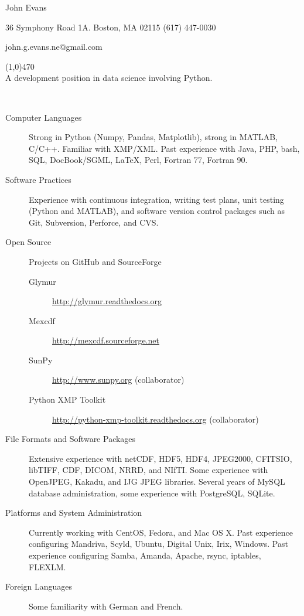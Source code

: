 \documentclass[11pt]{article}  %
\begin{document}
 
\centerline{{\Huge \sc John Evans}  }   %
\centerline{36 Symphony Road 1A. \textbullet \hspace{5pt}  Boston, MA  02115 \textbullet \hspace{5pt}  (617) 447-0030} 
\centerline{john.g.evans.ne@gmail.com} 
\noindent
\line(1,0){470}  \\

\smallskip %
\noindent
A development position in data science involving Python.\medskip

\bigskip %
\\ 
\begin{description}
  \item[Computer Languages]Strong in Python (Numpy, Pandas, Matplotlib), strong
    in MATLAB, C/C++.  Familiar with XMP/XML.  Past experience with Java, PHP,
    bash, SQL, DocBook/SGML, \LaTeX, Perl, Fortran 77, Fortran 90.
  \item[Software Practices]Experience with continuous integration, writing
    test plans, unit testing (Python and MATLAB), and software version control
    packages such as Git, Subversion, Perforce, and CVS.
  \item[Open Source]Projects on GitHub and SourceForge
    \begin{description}
      \item[Glymur]\url{http://glymur.readthedocs.org}
      \item[Mexcdf]\url{http://mexcdf.sourceforge.net}
      \item[SunPy]\url{http://www.sunpy.org} (collaborator)
      \item[Python XMP Toolkit]\url{http://python-xmp-toolkit.readthedocs.org}
        (collaborator)
    \end{description}
  \item[File Formats and Software Packages]Extensive experience with netCDF,
    HDF5, HDF4, JPEG2000, CFITSIO, libTIFF, CDF, DICOM, NRRD, and NIfTI.  Some
    experience with OpenJPEG, Kakadu, and IJG JPEG libraries.  Several years of
    MySQL database administration, some experience with PostgreSQL, SQLite.
  \item[Platforms and System Administration]Currently working with CentOS,
    Fedora, and Mac OS X.  Past experience configuring Mandriva, Scyld, Ubuntu,
    Digital Unix, Irix, Windows.  Past experience configuring Samba, Amanda,
    Apache, rsync, iptables, FLEXLM.
  \item[Foreign Languages]Some familiarity with German and French.
\end{description}
\end{document}
